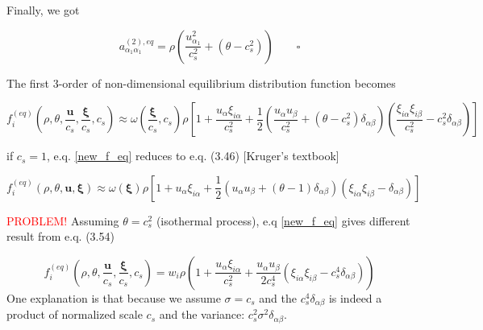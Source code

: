 \documentclass[draft]{article}
\begin{document}
Finally, we got

$$
a^{(2), eq}_{\alpha_1 \alpha_1} = \rho \left ( \frac{u_{\alpha_1}^2}{c_s^2} + (\theta - c_s^2) \right ) \qquad \square
$$

\vspace*{1cm}
The first 3-order of non-dimensional equilibrium distribution function becomes
\vspace*{0.5cm}

\begin{equation}
	f^{(eq)}_i \left ( \rho, \theta, \frac{\bm{u}}{c_s}, \frac{\bm{\xi}}{c_s}, c_s \right ) \approx \omega \left ( \frac{\bm{\xi}}{c_s}, c_s \right ) \rho \left [ 1 + \frac{u_\alpha \xi_{i \alpha}}{c_s^2} + \frac{1}{2} \left ( \frac{u_\alpha u_\beta}{c_s^2} + (\theta - c_s^2)\delta_{\alpha \beta} \right ) \left ( \frac{\xi_{i \alpha} \xi_{i \beta}}{c_s^2} - c_s^2 \delta_{\alpha \beta}\right ) \right ] \label{new_f_eq}
\end{equation}

\vspace*{0.5cm}
if $c_s = 1$, e.q. \eqref{new_f_eq} reduces to e.q. (3.46) [Kruger's textbook]

$$
f^{(eq)}_i ( \rho, \theta, \bm{u}, \bm{\xi} ) \approx \omega(\bm{\xi}) \rho \left [ 1 + u_\alpha \xi_{i \alpha} + \frac{1}{2} \left ( u_\alpha u_\beta + (\theta - 1) \delta_{\alpha \beta} \right ) \left ( \xi_{i \alpha} \xi_{i \beta} - \delta_{\alpha \beta}\right ) \right ]
$$

\textcolor{red}{PROBLEM!} Assuming $\theta = c_s^2$ (isothermal process), e.q \eqref{new_f_eq} gives different result from e.q. (3.54)



$$
	f^{(eq)}_i \left ( \rho, \theta, \frac{\bm{u}}{c_s}, \frac{\bm{\xi}}{c_s}, c_s \right ) = w_i \rho \left ( 1 + \frac{u_\alpha \xi_{i \alpha}}{c_s^2} + \frac{u_\alpha u_\beta}{2 c_s^4} \left ( \xi_{i \alpha} \xi_{i \beta} - c_s^4 \delta_{\alpha \beta}\right ) \right )
$$
One explanation is that because we assume $\sigma = c_s$ and the $c_s^4 \delta_{\alpha \beta}$ is indeed a product of normalized scale $c_s$ and the variance: $c_s^2 \sigma^2 \delta_{\alpha \beta}$.

\clearpage
\end{document}
